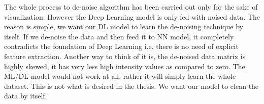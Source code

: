 The whole process to de-noise algorithm has been carried out only for the sake of visualization. However the Deep Learning model is only fed with noised data. The reason is simple, we want our DL model to learn the de-noising technique by itself. If we de-noise the data and then feed it to NN model, it completely contradicts the foundation of Deep Learning i.e. there is no need of explicit feature extraction. Another way to think of it is, the de-noised data matrix is highly skewed, it has very less high intensity values as compared to zero. The ML/DL model would not work at all, rather it will simply learn the whole dataset. This is not what is desired in the thesis. We want our model to clean the data by itself.